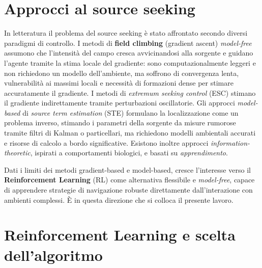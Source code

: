 \section{Approcci al source seeking}

In letteratura il problema del source seeking \`e stato affrontato secondo diversi
paradigmi di controllo. I metodi di \textbf{field climbing} (gradient ascent)
\emph{model-free} assumono che l'intensit\`a del campo cresca avvicinandosi alla
sorgente e guidano l'agente tramite la stima locale del gradiente: sono
computazionalmente leggeri e non richiedono un modello dell'ambiente, ma soffrono di
convergenza lenta, vulnerabilit\`a ai massimi locali e necessit\`a di formazioni dense
per stimare accuratamente il gradiente. I metodi di \emph{extremum seeking control} (ESC)
stimano il gradiente indirettamente tramite perturbazioni oscillatorie. Gli approcci
\emph{model-based} di \emph{source term estimation} (STE) formulano la localizzazione
come un problema inverso, stimando i parametri della sorgente da misure rumorose tramite
filtri di Kalman o particellari, ma richiedono modelli ambientali accurati e risorse di
calcolo a bordo significative. Esistono inoltre approcci \emph{information-theoretic},
ispirati a comportamenti biologici, e basati su \emph{apprendimento}.

Dati i limiti dei metodi gradient-based e model-based, cresce l'interesse verso il
\textbf{Reinforcement Learning} (RL) come alternativa flessibile e \emph{model-free},
capace di apprendere strategie di navigazione robuste direttamente dall'interazione con
ambienti complessi. \`E in questa direzione che si colloca il presente lavoro.

\section{Reinforcement Learning e scelta dell'algoritmo}
\label{sec:intro_rl}

